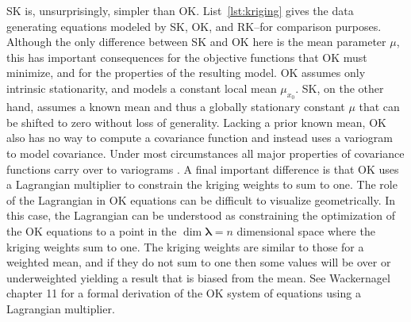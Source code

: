 \documentclass[]{interact}
\theoremstyle{plain}%
\theoremstyle{definition}
\theoremstyle{remark}
\begin{document}
SK is, unsurprisingly, simpler than OK.  List~\ref{lst:kriging} gives the data generating equations modeled by SK, OK, and RK--for comparison purposes.  Although the only difference between SK and OK here is the mean parameter $\mu$, this has important consequences for the objective functions that OK must minimize, and for the properties of the resulting model.  OK assumes only intrinsic stationarity, and models a constant local mean $\mu_{x_0}$.  SK, on the other hand, assumes a known mean and thus a globally stationary constant $\mu$ that can be shifted to zero without loss of generality.  Lacking a prior known mean, OK also has no way to compute a covariance function and instead uses a variogram to model covariance.  Under most circumstances all major properties of covariance functions carry over to variograms \citep{gneiting00, wackernagel03a}.  %
A final important difference is that OK uses a Lagrangian multiplier to constrain the kriging weights to sum to one.  The role of the Lagrangian in OK equations can be difficult to visualize geometrically.  In this case, the Lagrangian can be understood as constraining the optimization of the OK equations to a point in the $\dim{\bm{\lambda}} = n$ dimensional space where the kriging weights sum to one.  The kriging weights are similar to those for a weighted mean, and if they do not sum to one then some values will be over or underweighted yielding a result that is biased from the mean.  See Wackernagel \cite{wackernagel03a} chapter 11 for a formal derivation of the OK system of equations using a Lagrangian multiplier.%
\end{document}
